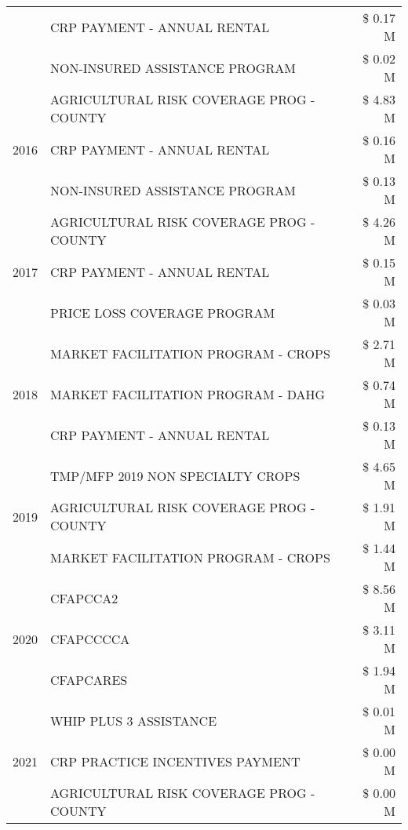 \begin{tabular}{llr}
 & CRP PAYMENT - ANNUAL RENTAL & \$ 0.17 M \\
 & NON-INSURED ASSISTANCE PROGRAM & \$ 0.02 M \\
\cline{1-3}
\multirow[t]{3}{*}{2016} & AGRICULTURAL RISK COVERAGE PROG - COUNTY & \$ 4.83 M \\
 & CRP PAYMENT - ANNUAL RENTAL & \$ 0.16 M \\
 & NON-INSURED ASSISTANCE PROGRAM & \$ 0.13 M \\
\cline{1-3}
\multirow[t]{3}{*}{2017} & AGRICULTURAL RISK COVERAGE PROG - COUNTY & \$ 4.26 M \\
 & CRP PAYMENT - ANNUAL RENTAL & \$ 0.15 M \\
 & PRICE LOSS COVERAGE PROGRAM & \$ 0.03 M \\
\cline{1-3}
\multirow[t]{3}{*}{2018} & MARKET FACILITATION PROGRAM - CROPS & \$ 2.71 M \\
 & MARKET FACILITATION PROGRAM - DAHG & \$ 0.74 M \\
 & CRP PAYMENT - ANNUAL RENTAL & \$ 0.13 M \\
\cline{1-3}
\multirow[t]{3}{*}{2019} & TMP/MFP 2019 NON SPECIALTY CROPS & \$ 4.65 M \\
 & AGRICULTURAL RISK COVERAGE PROG - COUNTY & \$ 1.91 M \\
 & MARKET FACILITATION PROGRAM - CROPS & \$ 1.44 M \\
\cline{1-3}
\multirow[t]{3}{*}{2020} & CFAPCCA2 & \$ 8.56 M \\
 & CFAPCCCCA & \$ 3.11 M \\
 & CFAPCARES & \$ 1.94 M \\
\cline{1-3}
\multirow[t]{3}{*}{2021} & WHIP PLUS 3 ASSISTANCE & \$ 0.01 M \\
 & CRP PRACTICE INCENTIVES PAYMENT & \$ 0.00 M \\
 & AGRICULTURAL RISK COVERAGE PROG - COUNTY & \$ 0.00 M \\
\cline{1-3}
\bottomrule
\end{tabular}
